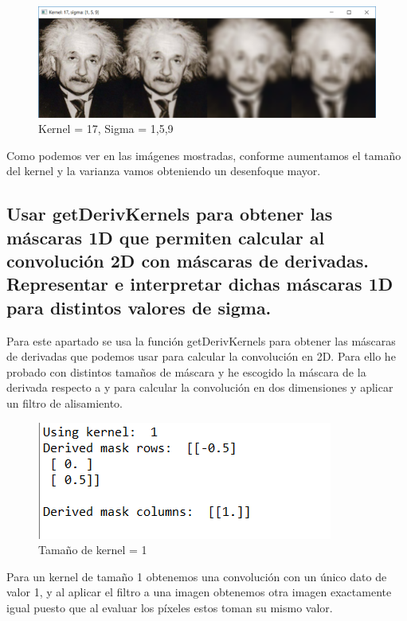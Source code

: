 \documentclass{article}
\begin{document}
\begin{figure}[h]

\centering
\includegraphics[scale=0.58]{1a3.PNG}
\caption{Kernel = 17, Sigma = 1,5,9}
\end{figure}

Como podemos ver en las imágenes mostradas, conforme aumentamos el tamaño del kernel y la varianza vamos obteniendo un desenfoque mayor.



\newpage
\subsection{ Usar getDerivKernels para obtener las máscaras 1D que permiten calcular al convolución 2D con máscaras de derivadas. Representar e interpretar dichas máscaras 1D para distintos valores de sigma.}

Para este apartado se usa la función getDerivKernels para obtener las máscaras de derivadas que podemos usar para calcular la convolución en 2D. Para ello he probado con distintos tamaños de máscara y he escogido la máscara de la derivada respecto a y para calcular la convolución en dos dimensiones y aplicar un filtro de alisamiento.

\begin{figure}[h]

\centering
\includegraphics[scale=1.1]{1b1.PNG}
\caption{Tamaño de kernel = 1}
\end{figure}

Para un kernel de tamaño 1 obtenemos una convolución con un único dato de valor 1, y al aplicar el filtro a una imagen obtenemos otra imagen exactamente igual puesto que al evaluar los píxeles estos toman su mismo valor.
\end{document}
